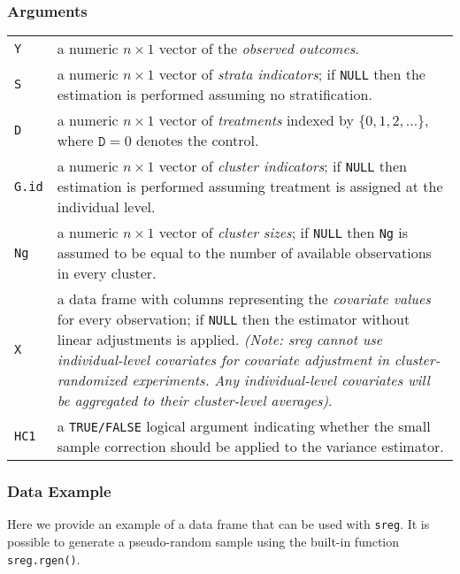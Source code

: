 \documentclass{article}
\makeatletter
\newenvironment{argdesc}{
    \par %
    \noindent %
    \normalfont %
    
    \begin{tabular}{@{}p{0.3\textwidth}p{0.6\textwidth}@{}} %
}{
    \end{tabular}
    \par %
   
}
\makeatother
\begin{document}
\subsubsection*{Arguments}
\begin{argdesc}
    \texttt{Y} & a numeric $n \times 1$ vector of the \textit{observed outcomes}. \\
    \texttt{S} & a numeric $n \times 1$ vector of \textit{strata indicators}; if \texttt{NULL} then the estimation is performed assuming no stratification. \\
    \texttt{D} & a numeric $n \times 1$ vector of \textit{treatments} indexed by $\{0, 1, 2, \ldots\}$, where $\texttt{D} = 0$ denotes the control. \\
    \texttt{G.id} & a numeric $n \times 1$ vector of \textit{cluster indicators}; if \texttt{NULL} then estimation is performed assuming treatment is assigned at the individual level. \\
    \texttt{Ng} & a numeric $n \times 1$ vector of \textit{cluster sizes}; if \texttt{NULL} then \texttt{Ng} is assumed to be equal to the number of available observations in every cluster.\\ %
    \texttt{X} & a data frame with columns representing the \textit{covariate values} for every observation; if \texttt{NULL} then the estimator without linear adjustments is applied. \textit{(Note: sreg cannot use individual-level covariates for covariate adjustment in cluster-randomized experiments. Any individual-level covariates will be aggregated to their cluster-level averages)}. \\
    \texttt{HC1} & a \texttt{TRUE/FALSE} logical argument indicating whether the small sample correction should be applied to the variance estimator. \\
\end{argdesc}

\subsubsection*{Data Example}
Here we provide an example of a data frame that can be used with \texttt{sreg}. It is possible to generate a pseudo-random sample using the built-in function \texttt{sreg.rgen()}.
\end{document}

